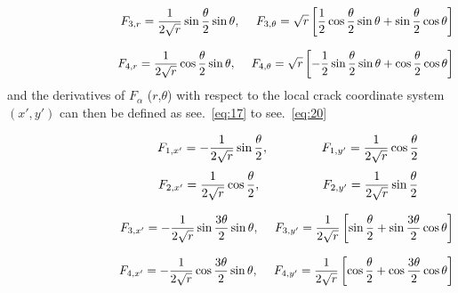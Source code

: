 \documentclass[fleqn, 12.5pt,a4paper]{report}
\newcommand\tab[1][1cm]{\hspace*{#1}}
\begin{document}
\begin{align}\label{eq:15}
\hspace{3.25cm}F_{3,r} = \frac{1}{2\sqrt r} \sin\frac{\theta}{2} \sin\theta, \tab[0.45cm] F_{3,\theta} = \sqrt r \left[\frac{1}{2}\cos\frac{\theta}{2} \sin\theta + \sin\frac{\theta}{2} \cos\theta \right]
\end{align}

\begin{align}\label{eq:16}
\hspace{3.25cm}F_{4,r} = \frac{1}{2\sqrt r} \cos\frac{\theta}{2} \sin\theta, \tab[0.45cm] F_{4,\theta} = \sqrt r \left[-\frac{1}{2}\sin\frac{\theta}{2} \sin\theta + \cos\frac{\theta}{2} \cos\theta \right]
\end{align}
and the derivatives of {$F_\alpha$} ($r$,$\theta$)\cite{mohammadi2008extended} with respect to the local crack coordinate system $(x', y')$ can then be defined as see.~\autoref{eq:17} to see.~\autoref{eq:20}

\begin{align}\label{eq:17}
\hspace{3.25cm}F_{1,x'} = -\frac{1}{2\sqrt r} \sin\frac{\theta}{2}, \tab[1.5cm] F_{1,y'} = \frac{1}{2\sqrt r} \cos\frac{\theta}{2}
\end{align}
\vspace{-1cm}
\begin{align}\label{eq:18}
\hspace{3.25cm}F_{2,x'} = \frac{1}{2\sqrt r} \cos\frac{\theta}{2}, \tab[1.75cm] F_{2,y'} = \frac{1}{2\sqrt r} \sin\frac{\theta}{2}
\end{align}

\begin{align}\label{eq:19}
\hspace{3.25cm}F_{3,x'} = -\frac{1}{2\sqrt r} \sin\frac{3\theta}{2} \sin\theta, \tab[0.45cm] F_{3,y'} = \frac{1}{2\sqrt r} \left[\sin\frac{\theta}{2} + \sin\frac{3\theta}{2} \cos\theta \right]
\end{align}

\begin{align}\label{eq:20}
\hspace{3.25cm}F_{4,x'} = -\frac{1}{2\sqrt r} \cos\frac{3\theta}{2} \sin\theta, \tab[0.45cm] F_{4,y'} = \frac{1}{2\sqrt r} \left[\cos\frac{\theta}{2} + \cos\frac{3\theta}{2} \cos\theta \right]
\end{align}
\end{document}
